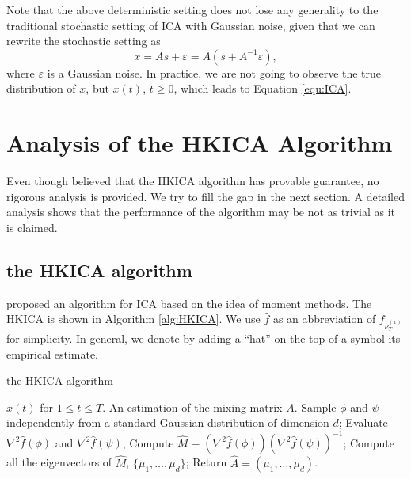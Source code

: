 \documentclass[twoside]{article}
\theoremstyle{definition}
\newcommand{\eps}{\varepsilon}
\begin{document}
Note that the above deterministic setting does not lose any generality to the traditional stochastic setting of ICA with Gaussian noise, given that we can rewrite the stochastic setting as 
\[
x = As+\eps = A(s+A^{-1}\eps),
\] 
where $\eps$ is a Gaussian noise. In practice, we are not going to observe the true distribution of $x$, but $x(t)$, $t\ge 0$, which leads to Equation \eqref{equ:ICA}.
\fi


\section{Analysis of the HKICA Algorithm}
\label{sec:AnalysisHK}
Even though \citet{hsu2013learning} believed that the HKICA algorithm has provable guarantee, no rigorous analysis is provided. 
We try to fill the gap in the next section. 
A detailed analysis shows that the performance of the algorithm may be not as trivial as it is claimed.

\subsection{the HKICA algorithm}
\label{subsec:HKalg}
\citet{DHsu2012} proposed an algorithm for ICA based on the idea of moment methods. 
The HKICA is shown in Algorithm \ref{alg:HKICA}. 
We use  $\widehat{f}$  as an abbreviation of $f_{\nu_T^{(x)}}$ for simplicity.
In general, we denote by adding a ``hat'' on the top of a symbol its empirical estimate. 
\begin{algorithm}[H]
\caption{the HKICA algorithm}
\label{alg:HKICA}
\begin{algorithmic}[1]
\INPUT $x(t)$ for $1\le t \le T$. 
\OUTPUT An estimation of the mixing matrix $A$. 
\STATE Sample $\phi$ and $\psi$ independently from a standard Gaussian distribution of dimension $d$;
\STATE Evaluate $\nabla^2\widehat{f}(\phi)$ and $\nabla^2\widehat{f}(\psi)$, 
\STATE Compute $\widehat{M} = (\nabla^2 \widehat{f}(\phi))(\nabla^2\widehat{f}(\psi))^{-1}$;
\STATE Compute all the eigenvectors of $\widehat{M}$, $\{\mu_1,\ldots,\mu_d\}$;
\STATE Return $\widehat{A} = (\mu_1,\ldots,\mu_d)$.
\end{algorithmic}
\end{algorithm}
\end{document}
